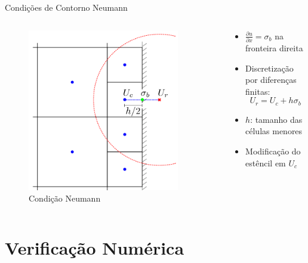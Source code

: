 \documentclass[../main/main.tex]{subfiles}
\begin{document}
\begin{frame}{Condições de Contorno Neumann}
\begin{columns}[T]
\begin{column}{0.4\textwidth}
\begin{figure}
\centering
\includegraphics[width=0.9\textwidth]{imgs/figura3b.png}
\caption{Condição Neumann}
\end{figure}
\end{column}
\begin{column}{0.6\textwidth}
\begin{itemize}
\item $\frac{\partial u}{\partial x} = \sigma_b$ na fronteira direita
\item Discretização por diferenças finitas:
\[
U_r = U_c + h\sigma_b
\]
\item $h$: tamanho das células menores
\item Modificação do estêncil em $U_c$
\end{itemize}
\end{column}
\end{columns}
\end{frame}

\section{Verificação Numérica}
\end{document}
